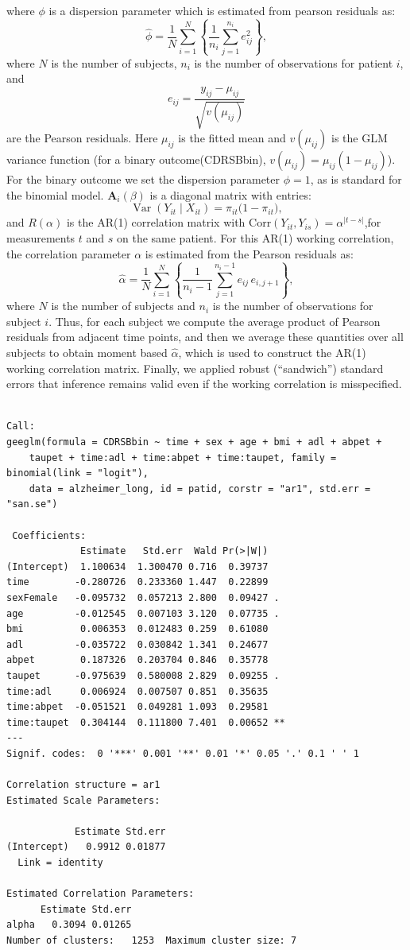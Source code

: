 \documentclass[
  11pt,
  letterpaper,
  DIV=11,
  numbers=noendperiod]{scrartcl}
\begin{document}
where \(\phi\) is a dispersion parameter which is estimated from pearson
residuals as: \[
\hat{\phi}
=
\frac{1}{N}
\sum_{i=1}^N
\left\{
\frac{1}{n_i}
\sum_{j=1}^{n_i} e_{ij}^2
\right\},
\] where \(N\) is the number of subjects, \(n_i\) is the number of
observations for patient \(i\), and \[
e_{ij} = \frac{y_{ij} - \mu_{ij}}{\sqrt{v(\mu_{ij})}}
\] are the Pearson residuals. Here \(\mu_{ij}\) is the fitted mean and
\(v(\mu_{ij})\) is the GLM variance function (for a binary
outcome(CDRSBbin), \(v(\mu_{ij}) = \mu_{ij}(1-\mu_{ij})\)). For the
binary outcome we set the dispersion parameter \(\phi = 1\), as is
standard for the binomial model. \(\mathbf{A}_i(\beta)\) is a diagonal
matrix with entries: \[
\operatorname{Var}(Y_{it} \mid X_{it}) = \pi_{it}\bigl(1 - \pi_{it}\bigr),
\] and \({R}(\alpha)\) is the AR(1) correlation matrix with
\(\text{Corr}(Y_{it}, Y_{is}) = \alpha^{|t-s|}\),for measurements \(t\)
and \(s\) on the same patient. For this AR(1) working correlation, the
correlation parameter \(\alpha\) is estimated from the Pearson residuals
as: \[
\hat{\alpha}
=
\frac{1}{N}
\sum_{i=1}^N
\left\{
\frac{1}{n_i - 1}
\sum_{j=1}^{n_i - 1} e_{ij}\,e_{i,j+1}
\right\},
\] where \(N\) is the number of subjects and \(n_i\) is the number of
observations for subject \(i\). Thus, for each subject we compute the
average product of Pearson residuals from adjacent time points, and then
we average these quantities over all subjects to obtain moment based
\(\hat{\alpha}\), which is used to construct the AR(1) working
correlation matrix. Finally, we applied robust (``sandwich'') standard
errors that inference remains valid even if the working correlation is
misspecified.

\begin{verbatim}

Call:
geeglm(formula = CDRSBbin ~ time + sex + age + bmi + adl + abpet + 
    taupet + time:adl + time:abpet + time:taupet, family = binomial(link = "logit"), 
    data = alzheimer_long, id = patid, corstr = "ar1", std.err = "san.se")

 Coefficients:
             Estimate   Std.err  Wald Pr(>|W|)   
(Intercept)  1.100634  1.300470 0.716  0.39737   
time        -0.280726  0.233360 1.447  0.22899   
sexFemale   -0.095732  0.057213 2.800  0.09427 . 
age         -0.012545  0.007103 3.120  0.07735 . 
bmi          0.006353  0.012483 0.259  0.61080   
adl         -0.035722  0.030842 1.341  0.24677   
abpet        0.187326  0.203704 0.846  0.35778   
taupet      -0.975639  0.580008 2.829  0.09255 . 
time:adl     0.006924  0.007507 0.851  0.35635   
time:abpet  -0.051521  0.049281 1.093  0.29581   
time:taupet  0.304144  0.111800 7.401  0.00652 **
---
Signif. codes:  0 '***' 0.001 '**' 0.01 '*' 0.05 '.' 0.1 ' ' 1

Correlation structure = ar1 
Estimated Scale Parameters:

            Estimate Std.err
(Intercept)   0.9912 0.01877
  Link = identity 

Estimated Correlation Parameters:
      Estimate Std.err
alpha   0.3094 0.01265
Number of clusters:   1253  Maximum cluster size: 7 
\end{verbatim}
\end{document}

